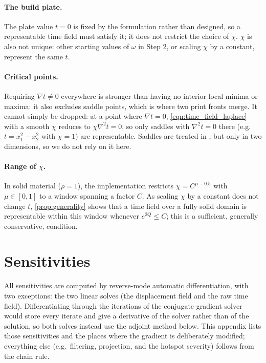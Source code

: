 \documentclass{article}
\begin{document}
\paragraph{The build plate.}
The plate value $t = 0$ is fixed by the formulation rather than designed, so a representable time field must satisfy it; it does not restrict the choice of $\chi$.
$\chi$ is also not unique: other starting values of $\omega$ in Step 2, or scaling $\chi$ by a constant, represent the same $t$.

\paragraph{Critical points.}
Requiring $\nabla t \neq 0$ everywhere is stronger than having no interior local minima or maxima: it also excludes saddle points, which is where two print fronts merge.
It cannot simply be dropped: at a point where $\nabla t = 0$, \autoref{eqn:time_field_laplace} with a smooth $\chi$ reduces to $\chi \nabla^2 t = 0$, so only saddles with $\nabla^2 t = 0$ there (e.g.\ $t = x_1^2 - x_2^2$ with $\chi = 1$) are representable.
Saddles are treated in \cite{alessandrini1986identification}, but only in two dimensions, so we do not rely on it here.

\paragraph{Range of $\chi$.}
In solid material ($\rho = 1$), the implementation restricts $\chi = C^{\mu - 0.5}$ with $\mu \in [0, 1]$ to a window spanning a factor $C$.
As scaling $\chi$ by a constant does not change $t$, \autoref{prop:generality} shows that a time field over a fully solid domain is representable within this window whenever $e^{2Q} \leq C$; this is a sufficient, generally conservative, condition.

\section{Sensitivities}
\label{sec:sensitivities}

All sensitivities are computed by reverse-mode automatic differentiation, with two exceptions: the two linear solves (the displacement field and the raw time field).
Differentiating through the iterations of the conjugate gradient solver would store every iterate and give a derivative of the solver rather than of the solution, so both solves instead use the adjoint method below.
This appendix lists those sensitivities and the places where the gradient is deliberately modified; everything else (e.g.\ filtering, projection, and the hotspot severity) follows from the chain rule.
\end{document}
